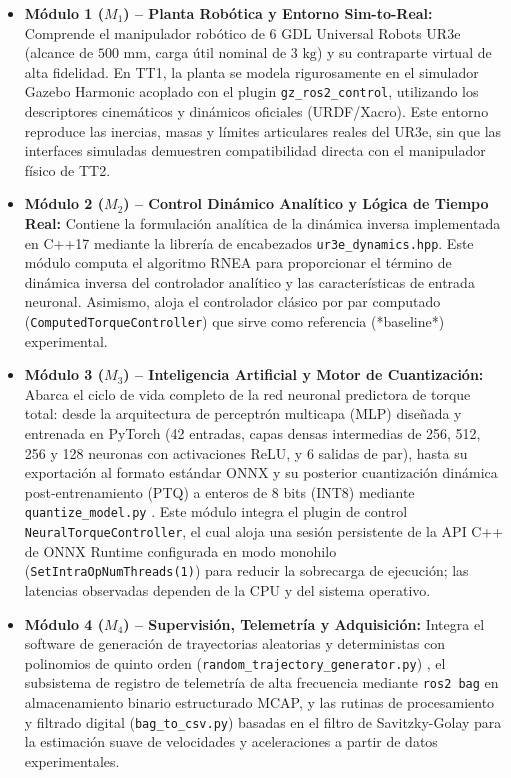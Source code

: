 \documentclass[12pt]{article}
\begin{document}
\begin{itemize}
    \item \textbf{Módulo 1 ($M_1$) -- Planta Robótica y Entorno Sim-to-Real:} 
    Comprende el manipulador robótico de 6 GDL Universal Robots UR3e (alcance de $500\text{ mm}$, carga útil nominal de $3\text{ kg}$) \cite{universal_robots_ur3e_manual} y su contraparte virtual de alta fidelidad. En TT1, la planta se modela rigurosamente en el simulador Gazebo Harmonic acoplado con el plugin \texttt{gz\_ros2\_control}, utilizando los descriptores cinemáticos y dinámicos oficiales (URDF/Xacro). Este entorno reproduce las inercias, masas y límites articulares reales del UR3e, sin que las interfaces simuladas demuestren compatibilidad directa con el manipulador físico de TT2.
    
    \item \textbf{Módulo 2 ($M_2$) -- Control Dinámico Analítico y Lógica de Tiempo Real:} 
    Contiene la formulación analítica de la dinámica inversa implementada en C++17 mediante la librería de encabezados \texttt{ur3e\_dynamics.hpp}. Este módulo computa el algoritmo RNEA \cite{luh1980online} para proporcionar el término de dinámica inversa del controlador analítico y las características de entrada neuronal. Asimismo, aloja el controlador clásico por par computado (\texttt{ComputedTorqueController}) \cite{spong2006robot} que sirve como referencia (*baseline*) experimental.
    
    \item \textbf{Módulo 3 ($M_3$) -- Inteligencia Artificial y Motor de Cuantización:} 
    Abarca el ciclo de vida completo de la red neuronal predictora de torque total: desde la arquitectura de perceptrón multicapa (MLP) diseñada y entrenada en PyTorch (42 entradas, capas densas intermedias de 256, 512, 256 y 128 neuronas con activaciones ReLU, y 6 salidas de par), hasta su exportación al formato estándar ONNX y su posterior cuantización dinámica post-entrenamiento (PTQ) a enteros de 8 bits (INT8) mediante \texttt{quantize\_model.py} \cite{jacob2018quantization}. Este módulo integra el plugin de control \texttt{NeuralTorqueController}, el cual aloja una sesión persistente de la API C++ de ONNX Runtime configurada en modo monohilo (\texttt{SetIntraOpNumThreads(1)}) para reducir la sobrecarga de ejecución; las latencias observadas dependen de la CPU y del sistema operativo.
    
    \item \textbf{Módulo 4 ($M_4$) -- Supervisión, Telemetría y Adquisición:} 
    Integra el software de generación de trayectorias aleatorias y deterministas con polinomios de quinto orden (\texttt{random\_trajectory\_generator.py}) \cite{biagiotti2008trajectory}, el subsistema de registro de telemetría de alta frecuencia mediante \texttt{ros2 bag} en almacenamiento binario estructurado MCAP, y las rutinas de procesamiento y filtrado digital (\texttt{bag\_to\_csv.py}) basadas en el filtro de Savitzky-Golay \cite{savitzky1964smoothing} para la estimación suave de velocidades y aceleraciones a partir de datos experimentales.
\end{itemize}
\end{document}
